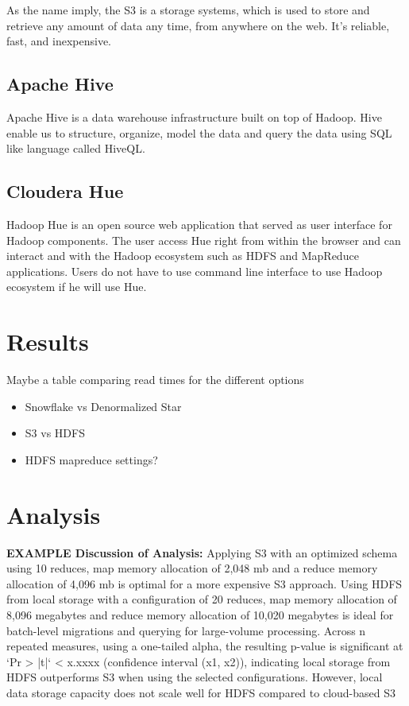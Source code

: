 \documentclass[journal]{IEEEtran}
\begin{document}
	As the name imply, the S3 is a storage systems, which is used to store and retrieve any amount of data any time, from anywhere on the web. It's reliable, fast, and inexpensive.
	
	\subsection{Apache Hive}
	
	Apache Hive is a data warehouse infrastructure built on top of Hadoop. Hive enable us to structure, organize, model the data and query the data using SQL like language called HiveQL.
	
	\subsection{Cloudera Hue}
	
	Hadoop Hue is an open source web application that served as user interface for Hadoop components. The user access Hue right from within the browser and can interact and with the Hadoop ecosystem such as HDFS and MapReduce applications. Users do not have to use command line interface to use Hadoop ecosystem if he will use Hue.
	
	\section{Results}
	
	Maybe a table comparing read times for the different options
	
	\begin{itemize}
		\item Snowflake vs Denormalized Star
		\item S3 vs HDFS
		\item HDFS mapreduce settings?
	\end{itemize}
	
	\section{Analysis}
	
	\textbf{EXAMPLE Discussion of Analysis:} Applying S3 with an optimized schema using 10 reduces, map memory allocation of 2,048 mb and a reduce memory allocation of 4,096 mb is optimal for a more expensive S3 approach. Using HDFS from local storage with a configuration of 20 reduces, map memory allocation of 8,096 megabytes and reduce memory allocation of 10,020 megabytes is ideal for batch-level migrations and querying for large-volume processing. Across n repeated measures, using a one-tailed alpha, the resulting p-value is significant at `Pr > |t|` < x.xxxx (confidence interval (x1, x2)), indicating local storage from HDFS outperforms S3 when using the selected configurations. However, local data storage capacity does not scale well for HDFS compared to cloud-based S3
	
\end{document}
